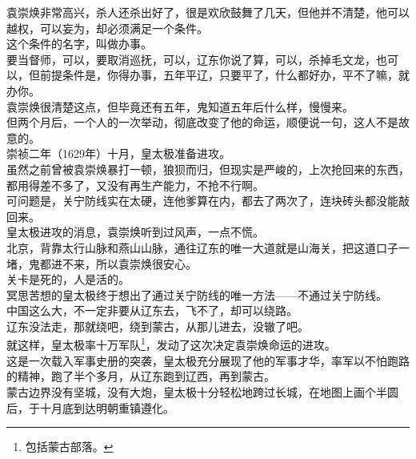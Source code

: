 \begin{multicols}{\theparacolNo}
袁崇焕非常高兴，杀人还杀出好了，很是欢欣鼓舞了几天，但他并不清楚，他可以越权，可以妄为，却必须满足一个条件。\\

这个条件的名字，叫做办事。\\

要当督师，可以，要取消巡抚，可以，辽东你说了算，可以，杀掉毛文龙，也可以，但前提条件是，你得办事，五年平辽，只要平了，什么都好办，平不了嘛，就办你。\\

袁崇焕很清楚这点，但毕竟还有五年，鬼知道五年后什么样，慢慢来。\\

但两个月后，一个人的一次举动，彻底改变了他的命运，顺便说一句，这人不是故意的。\\

崇祯二年（1629年）十月，皇太极准备进攻。\\

虽然之前曾被袁崇焕暴打一顿，狼狈而归，但现实是严峻的，上次抢回来的东西，都用得差不多了，又没有再生产能力，不抢不行啊。\\

可问题是，关宁防线实在太硬，连他爹算在内，都去了两次了，连块砖头都没能敲回来。\\

皇太极进攻的消息，袁崇焕听到过风声，一点不慌。\\

北京，背靠太行山脉和燕山山脉，通往辽东的唯一大道就是山海关，把这道口子一堵，鬼都进不来，所以袁崇焕很安心。\\

关卡是死的，人是活的。\\

冥思苦想的皇太极终于想出了通过关宁防线的唯一方法——不通过关宁防线。\\

中国这么大，不一定非要从辽东去，飞不了，却可以绕路。\\

辽东没法走，那就绕吧，绕到蒙古，从那儿进去，没辙了吧。\\

就这样，皇太极率十万军队\footnote{包括蒙古部落。}，发动了这次决定袁崇焕命运的进攻。\\

这是一次载入军事史册的突袭，皇太极充分展现了他的军事才华，率军以不怕跑路的精神，跑了半个多月，从辽东跑到辽西，再到蒙古。\\

蒙古边界没有坚城，没有大炮，皇太极十分轻松地跨过长城，在地图上画个半圆后，于十月底到达明朝重镇遵化。\\


\end{multicols}
